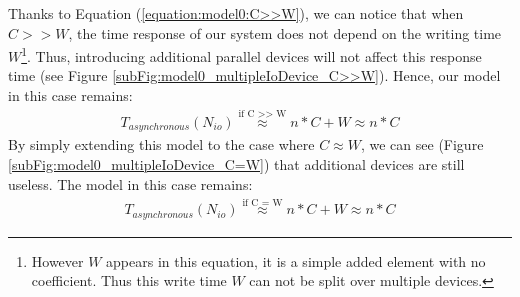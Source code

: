 		Thanks to Equation (\ref{equation:model0:C>>W}), we can notice that when $C >> W$, the time response of our system does not depend on the writing time $W$\footnote{However $W$ appears in this equation, it is a simple added element with no coefficient.   Thus this write time $W$ can not be split over multiple devices.}.   Thus, introducing additional parallel \notationIO\space devices will not affect this response time (see Figure \ref{subFig:model0_multipleIoDevice_C>>W}).   Hence, our model in this case remains:
			\begin{equation}
			\begin{aligned}
				T_{asynchronous}(N_{io})	\stackrel{\text{if C >> W}}{\approx} n * C + W
											\stackrel{}{\approx} n * C
			\end{aligned}
			\end{equation}
		By simply extending this model to the case where $C \approx W$, we can see (Figure \ref{subFig:model0_multipleIoDevice_C=W}) that additional \notationIO\space devices are still useless.   The model in this case remains:\\
			\begin{equation}
			\begin{aligned}
				T_{asynchronous}(N_{io})	\stackrel{\text{if C = W}}{\approx} n * C + W
											\stackrel{}{\approx} n * C
			\end{aligned}
			\end{equation}
